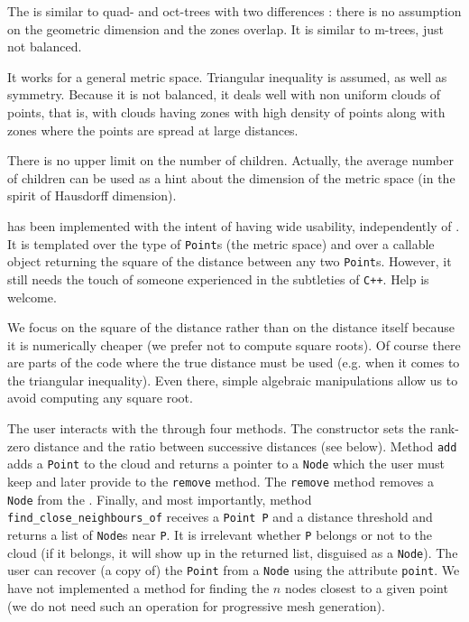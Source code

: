 The {\small\tt{}} is similar to quad- and oct-trees with two differences :
there is no assumption on the geometric dimension and the zones overlap.
It is similar to m-trees, just not balanced.

It works for a general metric space.
Triangular inequality is assumed, as well as symmetry.
Because it is not balanced, it deals well with non uniform clouds of points, that is,
with clouds having zones with
high density of points along with zones where the points are spread at large distances.

There is no upper limit on the number of children.
Actually, the average number of children can be used as a hint about the dimension of the
metric space (in the spirit of Hausdorff dimension).

{\small\tt {}} has been implemented with the intent of having wide usability,
independently of \maniFEM.
It is templated over the type of {\small\tt Point}s (the metric space) and over a callable
object returning the square of the distance between any two {\small\tt Point}s.
However, it still needs the touch of someone experienced in the subtleties of {\tt C++}.
Help is welcome.

We focus on the square of the distance rather than on the distance itself because it
is numerically cheaper (we prefer not to compute square roots).
Of course there are parts of the code where the true distance must be used
(e.g. when it comes to the triangular inequality).
Even there, simple algebraic manipulations allow us to avoid computing any square root.

The user interacts with the {\small\tt{}} through four methods.
The constructor sets the rank-zero distance and the ratio between successive
distances (see below).
Method {\small\tt add} adds a {\small\tt Point} to the cloud and returns a pointer to a
{\small\tt Node} which the user must keep and later provide to the {\small\tt remove} method.
The {\small\tt remove} method removes a {\small\tt Node} from the {\small\tt{}}.
Finally, and most importantly, method {\small\tt find\_close\_neighbours\_of} receives a
{\small\tt Point P} and a distance threshold and returns a list of {\small\tt Node}s near
{\small\tt P}.
It is irrelevant whether {\small\tt P} belongs or not to the cloud (if it belongs, it will
show up in the returned list, disguised as a {\small\tt Node}).
The user can recover (a copy of) the {\small\tt Point} from a {\small\tt Node} using the attribute
{\small\tt point}.
We have not implemented a method for finding the $n$ nodes closest to a given point
(we do not need such an operation for progressive mesh generation).

